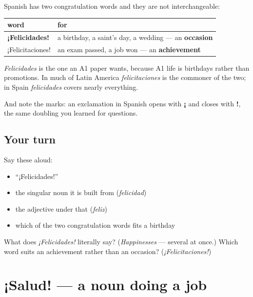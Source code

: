 \begin{grammarlens}[title={Grammar Lens: which one on which occasion}]
Spanish has two congratulation words and they are not interchangeable:

\noindent
\begin{tabularx}{\linewidth}{@{}>{\raggedright\arraybackslash}X>{\raggedright\arraybackslash}X@{}}
\toprule
\textbf{word} & \textbf{for} \\
\midrule
\textbf{¡Felicidades!} & a birthday, a saint's day, a wedding — an \textbf{occasion} \\
¡Felicitaciones! & an exam passed, a job won — an \textbf{achievement} \\
\bottomrule
\end{tabularx}

\emph{Felicidades} is the one an A1 paper wants, because A1 life is birthdays rather than promotions. In much of Latin America \emph{felicitaciones} is the commoner of the two; in Spain \emph{felicidades} covers nearly everything.

And note the marks: an exclamation in Spanish opens with \textbf{¡} and closes with \textbf{!}, the same doubling you learned for questions.
\end{grammarlens}

\subsection*{Your turn}
Say these aloud:

\begin{itemize}
\raggedright
  \item \textquotedblleft{}¡Felicidades!\textquotedblright{}
  \item the singular noun it is built from (\emph{felicidad})
  \item the adjective under that (\emph{feliz})
  \item which of the two congratulation words fits a birthday
\end{itemize}

\begin{tcolorbox}[breakable,colback=teal!4,colframe=teal!35!black,title={Before you move on}]
What does \emph{¡Felicidades!} literally say? (\emph{Happinesses} — several at once.) Which word suits an achievement rather than an occasion? (\emph{¡Felicitaciones!})
\end{tcolorbox}
\section[¡Salud!]{¡Salud! — a noun doing a job}


